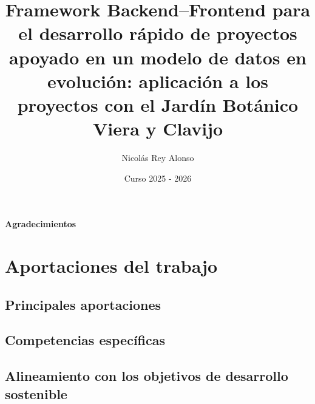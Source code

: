 \documentclass[oneside,12pt]{book}
\title{Framework Backend–Frontend para el desarrollo rápido de proyectos apoyado en un modelo de datos en evolución: aplicación a los proyectos con el Jardín Botánico Viera y Clavijo}
\author{Nicolás Rey Alonso}
\date{Curso 2025 - 2026}
\begin{document}


\newpage
{}
{\Large{\textbf{Agradecimientos}}}

\clearpage




\clearpage
{}





\chapter{Aportaciones del trabajo}
\section{Principales aportaciones}


\section{Competencias específicas}


\section{Alineamiento con los objetivos de desarrollo sostenible}
\end{document}
